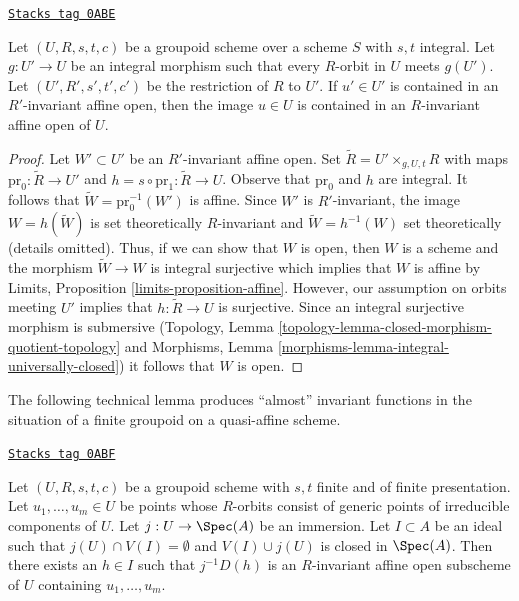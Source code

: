 \begin{lemma}
\label{more-groupoids-lemma-find-affine-integral}
\href{https://stacks.math.columbia.edu/tag/0ABE}{\texttt{Stacks tag 0ABE}}

Let $(U, R, s, t, c)$ be a groupoid scheme over a scheme $S$
with $s, t$ integral. Let $g : U' \to U$ be an integral morphism
such that every $R$-orbit in $U$ meets $g(U')$. Let $(U', R', s', t', c')$
be the restriction of $R$ to $U'$. If $u' \in U'$ is contained in an
$R'$-invariant affine open, then the image $u \in U$ is contained
in an $R$-invariant affine open of $U$.
\end{lemma}

\begin{proof}
Let $W' \subset U'$ be an $R'$-invariant affine open.
Set $\tilde R = U' \times_{g, U, t} R$ with maps
$\text{pr}_0 : \tilde R \to U'$ and $h = s \circ \text{pr}_1 : \tilde R \to U$.
Observe that $\text{pr}_0$ and $h$ are integral.
It follows that $\tilde W = \text{pr}_0^{-1}(W')$ is affine.
Since $W'$ is $R'$-invariant, the image
$W = h(\tilde W)$ is set theoretically $R$-invariant and
$\tilde W = h^{-1}(W)$ set theoretically (details omitted).
Thus, if we can show that $W$ is open, then $W$ is a scheme
and the morphism $\tilde W \to W$ is integral surjective
which implies that $W$ is affine by
Limits, Proposition \ref{limits-proposition-affine}.
However, our assumption on orbits meeting $U'$ implies
that $h : \tilde R \to U$ is surjective. Since an
integral surjective morphism is submersive
(Topology, Lemma \ref{topology-lemma-closed-morphism-quotient-topology}
and Morphisms, Lemma \ref{morphisms-lemma-integral-universally-closed})
it follows that $W$ is open.
\end{proof}

The following technical lemma produces ``almost'' invariant
functions in the situation of a finite groupoid on a quasi-affine
scheme.

\begin{lemma}
\label{more-groupoids-lemma-find-almost-invariant-function}
\href{https://stacks.math.columbia.edu/tag/0ABF}{\texttt{Stacks tag 0ABF}}

Let $(U, R, s, t, c)$ be a groupoid scheme with $s, t$ finite and of
finite presentation. Let $u_1, \ldots, u_m \in U$ be points whose $R$-orbits
consist of generic points of irreducible components of $U$.
Let $j : U \to \Spec(A)$ be an immersion.
Let $I \subset A$ be an ideal such that $j(U) \cap V(I) = \emptyset$
and $V(I) \cup j(U)$ is closed in $\Spec(A)$.
Then there exists an $h \in I$ such that $j^{-1}D(h)$
is an $R$-invariant affine open subscheme of $U$ containing
$u_1, \ldots, u_m$.
\end{lemma}

